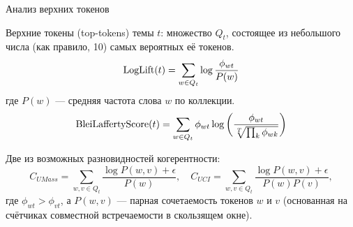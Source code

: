 \begin{frame}[t]{Анализ верхних токенов}

Верхние токены (top-tokens) темы $t$: множество $Q_t$, состоящее из небольшого числа (как правило, 10) самых вероятных её токенов.\\

\[
\textup{LogLift}(t) = \sum_{w\in Q_t} \log \frac{\phi_{wt}}{P(w)}
\]
где $P(w)$ ---  средняя частота слова $w$ по коллекции.
\[
\textup{BleiLaffertyScore}(t) = \sum_{w\in Q_t} \phi_{wt} \log \bigg( \frac{\phi_{wt}}{\sqrt[T]{\prod_k \phi_{wk}}}\bigg)
\]

Две из возможных разновидностей когерентности:\\
\[
C_{UMass} = \sum_{w,v \in Q_t} \frac{\log P(w, v) + \epsilon}{P(w)}, \quad
C_{UCI} = \sum_{w,v \in Q_t} \frac{\log P(w, v) + \epsilon}{P(w)P(v)},
\]
где $\phi_{wt} > \phi_{vt}$, а $P(w, v)$ --- парная сочетаемость токенов $w$ и $v$ (основанная на счётчиках совместной встречаемости в скользящем окне).

\end{frame}


